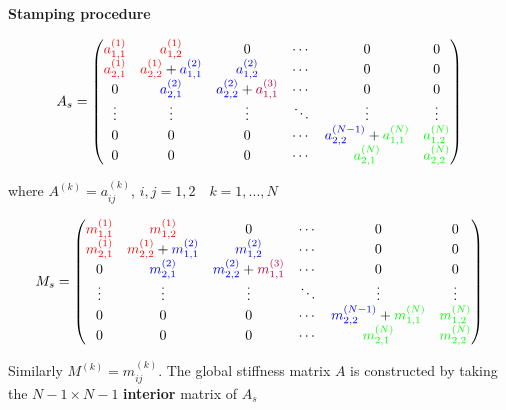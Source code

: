 \documentclass[12pt]{report}
\begin{document}
\textbf{Stamping procedure}

\[A_s=
 \begin{pmatrix}
  \textcolor{red}{a^{(1)}_{1,1}} & \textcolor{red}{a^{(1)}_{1,2}} & 0 & \cdots & 0 & 0 \\
  \textcolor{red}{a^{(1)}_{2,1}} & \textcolor{red}{a^{(1)}_{2,2}}+\textcolor{blue}{a^{(2)}_{1,1}} & \textcolor{blue}{a^{(2)}_{1,2}} & \cdots & 0 & 0\\
  0 & \textcolor{blue}{a^{(2)}_{2,1}} & \textcolor{blue}{a^{(2)}_{2,2}}+\textcolor{purple}{a^{(3)}_{1,1}} & \cdots & 0 & 0\\
  \vdots  & \vdots & \vdots & \ddots & \vdots & \vdots \\
   0 & 0 & 0 & \cdots & \textcolor{blue}{a^{(N-1)}_{2,2}}+\textcolor{green}{a^{(N)}_{1,1}}  & \textcolor{green}{a^{(N)}_{1,2}} \\
  0 & 0 & 0 & \cdots & \textcolor{green}{a^{(N)}_{2,1}} & \textcolor{green}{a^{(N)}_{2,2}} 
 \end{pmatrix}
\]

where $A^{(k)}=a^{(k)}_{ij}$, $i,j=1,2\quad{k}=1,...,N$


\[M_s=
 \begin{pmatrix}
  \textcolor{red}{m^{(1)}_{1,1}} & \textcolor{red}{m^{(1)}_{1,2}} & 0 & \cdots & 0 & 0 \\
  \textcolor{red}{m^{(1)}_{2,1}} & \textcolor{red}{m^{(1)}_{2,2}}+\textcolor{blue}{m^{(2)}_{1,1}} & \textcolor{blue}{m^{(2)}_{1,2}} & \cdots & 0 & 0\\
  0 & \textcolor{blue}{m^{(2)}_{2,1}} & \textcolor{blue}{m^{(2)}_{2,2}}+\textcolor{purple}{m^{(3)}_{1,1}} & \cdots & 0 & 0\\
  \vdots  & \vdots & \vdots & \ddots & \vdots & \vdots \\
   0 & 0 & 0 & \cdots & \textcolor{blue}{m^{(N-1)}_{2,2}}+\textcolor{green}{m^{(N)}_{1,1}}  & \textcolor{green}{m^{(N)}_{1,2}} \\
  0 & 0 & 0 & \cdots & \textcolor{green}{m^{(N)}_{2,1}} & \textcolor{green}{m^{(N)}_{2,2}} 
 \end{pmatrix}
\]

Similarly $M^{(k)}=m^{(k)}_{ij}$. The global stiffness matrix $A$ is constructed by taking the $N-1\times{N-1}$ \textbf{interior} matrix of $A_s$
\end{document}
